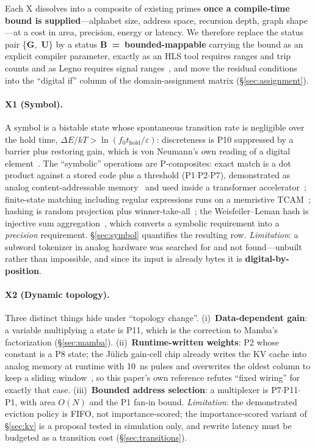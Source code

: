 \documentclass[11pt]{article}
\begin{document}
Each X dissolves into a composite of existing primes \textbf{once a compile-time bound is supplied}---alphabet size, address space, recursion depth, graph shape---at a cost in area, precision, energy or latency. We therefore replace the status pair \{\textbf{G},~\textbf{U}\} by a status \textbf{B~=~bounded-mappable} carrying the bound as an explicit compiler parameter, exactly as an HLS tool requires ranges and trip counts and as Legno requires signal ranges~\cite{legno2020}, and move the residual conditions into the ``digital if'' column of the domain-assignment matrix (\S\ref{sec:assignment}).

\paragraph{X1 (Symbol).} A symbol is a bistable state whose spontaneous transition rate is negligible over the hold time, $\Delta E/kT > \ln(f_0 t_{\mathrm{hold}}/\varepsilon)$: discreteness is P10 suppressed by a barrier plus restoring gain, which is von Neumann's own reading of a digital element~\cite{vonneumann1956}. The ``symbolic'' operations are P-composites: exact match is a dot product against a stored code plus a threshold (P1$\cdot$P2$\cdot$P7), demonstrated as analog content-addressable memory~\cite{li2020acam} and used inside a transformer accelerator~\cite{raceit2023}; finite-state matching including regular expressions runs on a memristive TCAM~\cite{graves2020tcam}; hashing is random projection plus winner-take-all~\cite{dasgupta2017,dasgupta2018}; the Weisfeiler--Leman hash is injective sum aggregation~\cite{xu2019gin}, which converts a symbolic requirement into a \textit{precision} requirement. \S\ref{sec:symbol} quantifies the resulting row. \textit{Limitation}: a subword tokenizer in analog hardware was searched for and not found---unbuilt rather than impossible, and since its input is already bytes it is \textbf{digital-by-position}.

\paragraph{X2 (Dynamic topology).} Three distinct things hide under ``topology change''. (i)~\textbf{Data-dependent gain}: a variable multiplying a state is P11, which is the correction to Mamba's factorization (\S\ref{sec:mamba}). (ii)~\textbf{Runtime-written weights}: P2 whose constant is a P8 state; the J\"ulich gain-cell chip already writes the KV cache into analog memory at runtime with 10~ns pulses and overwrites the oldest column to keep a sliding window~\cite{leroux2025a}, so this paper's own reference refutes ``fixed wiring'' for exactly that case. (iii)~\textbf{Bounded address selection}: a multiplexer is P7$\cdot$P11$\cdot$P1, with area $O(N)$ and the P1 fan-in bound. \textit{Limitation}: the demonstrated eviction policy is FIFO, not importance-scored; the importance-scored variant of \S\ref{sec:kv} is a proposal tested in simulation only, and rewrite latency must be budgeted as a transition cost (\S\ref{sec:transitions}).
\end{document}
